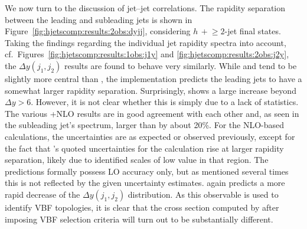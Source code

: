 We now turn to the discussion of jet--jet correlations.
The rapidity separation between the leading and subleading jets is
shown in Figure~\ref{fig:hjetscomp:results:2obs:dyjj}, considering
$h\,+\!\ge\!2$-jet final states. Taking the findings regarding the
individual jet rapidity spectra into account,
cf.~Figures~\ref{fig:hjetscomp:results:1obs:j1y} and
\ref{fig:hjetscomp:results:2obs:j2y}, the $\Delta y(j_1,j_2)$ results
are found to behave very similarly. While \Sherpa \NNLOPS and \MGaMC
tend to be slightly more central than \Powheg, the \Sherpa \MEPSatNLO
implementation predicts the leading jets to have a somewhat larger
rapidity separation. Surprisingly, \Herwig shows a large increase 
beyond $\Delta y>6$. However, it is not clear whether this is simply
due to a lack of statistics. The various \GoSam{}+\Sherpa NLO results
are in good agreement with each other and, as seen in the subleading
jet's spectrum, larger than  \Powheg  by about 20\%. For the NLO-based
calculations, the uncertainties are as expected or observed previously, except
for the fact that \Sherpa's quoted uncertainties for the \MEPSatNLO
calculation rise at larger rapidity separation, likely due to
identified scales of low value in that region. The \NNLOPS predictions
formally possess LO accuracy only, but as mentioned several times this is
not reflected by the given uncertainty estimates. \Hej again
predicts a more rapid decrease of the $\Delta y(j_1,j_2)$
distribution. As this observable is used to identify VBF topologies,
it is clear that the cross section computed by \Hej after imposing VBF
selection criteria will turn out to be substantially different.

